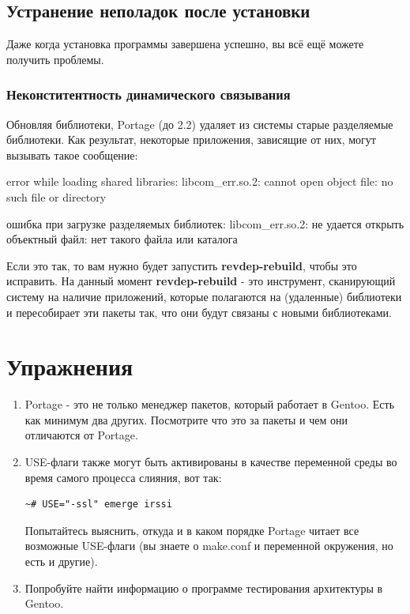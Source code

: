 \documentclass[10pt]{book}
\begin{document}
\subsection{Устранение неполадок после установки}

Даже когда установка программы завершена успешно, вы всё ещё можете получить проблемы.

\subsubsection{Неконститентность динамического связывания}

Обновляя библиотеки, Portage (до 2.2) удаляет из системы старые разделяемые библиотеки. Как результат, некоторые приложения, зависящие от них, могут вызывать такое сообщение:

\begin{tcolorbox}
error while loading shared libraries: libcom\_err.so.2: cannot
open object file: no such file or directory
\end{tcolorbox}

\begin{tcolorbox}
ошибка при загрузке разделяемых библиотек: libcom\_err.so.2: не удается открыть объектный файл: нет такого файла или каталога
\end{tcolorbox}

Если это так, то вам нужно будет запустить \textbf{revdep-rebuild}, чтобы это исправить. На данный момент \textbf{revdep-rebuild} - это инструмент, сканирующий систему на наличие приложений, которые полагаются на (удаленные) библиотеки и пересобирает эти пакеты так, что они будут связаны с новыми библиотеками.

\newpage
{\color{white}\section{Упражнения}}
\begin{tcolorbox}[title=\textbf{Упражнения}, colback=yellow!14!white, colframe=red!75!white]
\begin{enumerate}
\item Portage - это не только менеджер пакетов, который работает в Gentoo. Есть как минимум два других. Посмотрите что это за пакеты и чем они отличаются от Portage.

\item USE-флаги также могут быть активированы в качестве переменной среды во время самого процесса слияния, вот так: 
	
\begin{tcolorbox}
\begin{lstlisting}
~# USE="-ssl" emerge irssi
\end{lstlisting}
\end{tcolorbox}

Попытайтесь выяснить, откуда и в каком порядке Portage читает все возможные USE-флаги (вы знаете о make.conf и переменной окружения, но есть и другие).

\item Попробуйте найти информацию о программе тестирования архитектуры в Gentoo.
\end{enumerate}
\end{tcolorbox}
\end{document}
